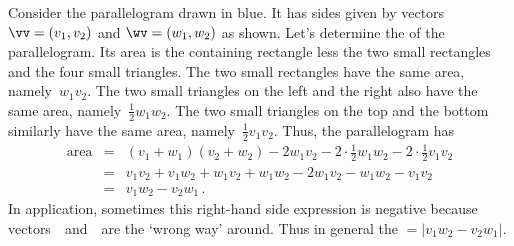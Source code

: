 \begin{wrapfigure}{r}{0pt} 
\end{wrapfigure}
Consider the parallelogram drawn in blue.
It has sides given by vectors \(\vv=(v_1,v_2)\) and \(\wv=(w_1,w_2)\) as shown.
Let's determine the  of the parallelogram. 
Its area is the containing rectangle less the two small rectangles and the four small triangles.
The two small rectangles have the same area, namely~\(w_1v_2\).
The two small triangles on the left and the right also have the same area, namely~\(\frac12w_1w_2\).
The two small triangles on the top and the bottom similarly have the same area, namely~\(\frac12v_1v_2\).
Thus, the parallelogram has 
\begin{eqnarray*}
\text{area}&=&(v_1+w_1)(v_2+w_2)-2w_1v_2-2\cdot\frac12w_1w_2-2\cdot\frac12v_1v_2
\nonumber
\\&=&v_1v_2+v_1w_2+w_1v_2+w_1w_2-2w_1v_2-w_1w_2-v_1v_2
\nonumber
\\&=&v_1w_2-v_2w_1\,. %
\end{eqnarray*}
In application, sometimes this right-hand side expression is negative because vectors~\vv\ and~\wv\ are the `wrong way' around.
Thus in general the \({}=|v_1w_2-v_2w_1|\).



